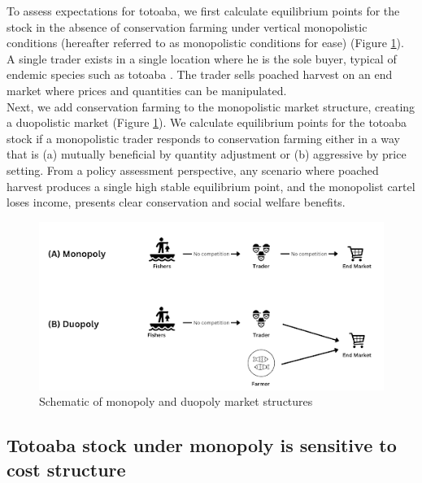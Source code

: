 To assess expectations for totoaba, we first calculate equilibrium points for the stock in the absence of conservation farming under vertical monopolistic conditions (hereafter referred to as monopolistic conditions for ease) (Figure \ref{fig:figure3}). A single trader exists in a single location where he is the sole buyer, typical of endemic species such as totoaba \citep{wyatt_differentiating_2020, martinez-alvarado_trafficking_2018}. The trader sells poached harvest on an end market where prices and quantities can be manipulated. 
\\
Next, we add conservation farming to the monopolistic market structure, creating a duopolistic market (Figure \ref{fig:figure3}). We calculate equilibrium points for the totoaba stock if a monopolistic trader responds to conservation farming either in a way that is (a) mutually beneficial by quantity adjustment or (b) aggressive by price setting. From a policy assessment perspective, any scenario where poached harvest produces a single high stable equilibrium point, and the monopolist cartel loses income, presents clear conservation and social welfare benefits.

\begin{figure}[h]
    \centering
    \includegraphics[width=0.85\linewidth]{figures/totoaba/schematic_market.png}
    \caption{Schematic of monopoly and duopoly market structures}
    \label{fig:figure3}
\end{figure}

\subsection{Totoaba stock under monopoly is sensitive to cost structure}

